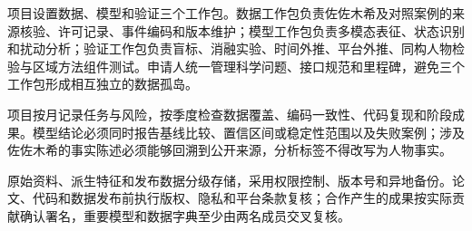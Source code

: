 \GXNSFBodyText

项目设置数据、模型和验证三个工作包。数据工作包负责佐佐木希及对照案例的来源核验、许可记录、事件编码和版本维护；模型工作包负责多模态表征、状态识别和扰动分析；验证工作包负责盲标、消融实验、时间外推、平台外推、同构人物检验与区域方法组件测试。申请人统一管理科学问题、接口规范和里程碑，避免三个工作包形成相互独立的数据孤岛。

项目按月记录任务与风险，按季度检查数据覆盖、编码一致性、代码复现和阶段成果。模型结论必须同时报告基线比较、置信区间或稳定性范围以及失败案例；涉及佐佐木希的事实陈述必须能够回溯到公开来源，分析标签不得改写为人物事实。

原始资料、派生特征和发布数据分级存储，采用权限控制、版本号和异地备份。论文、代码和数据发布前执行版权、隐私和平台条款复核；合作产生的成果按实际贡献确认署名，重要模型和数据字典至少由两名成员交叉复核。
